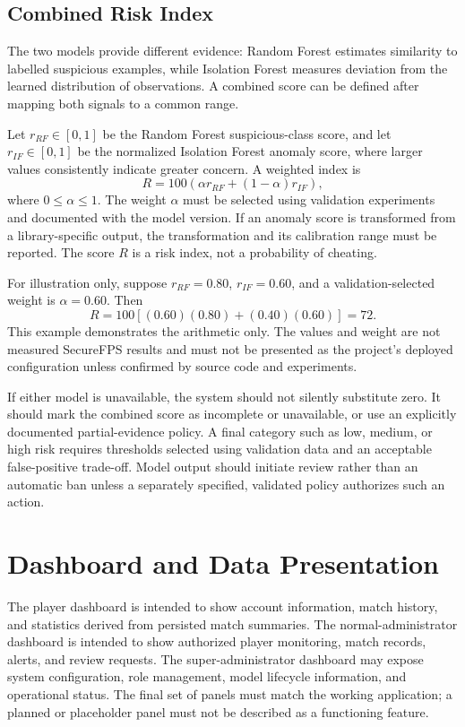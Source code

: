 \documentclass[conference]{IEEEtran}
\begin{document}
\subsection{Combined Risk Index}
The two models provide different evidence: Random Forest estimates similarity to labelled suspicious examples, while Isolation Forest measures deviation from the learned distribution of observations. A combined score can be defined after mapping both signals to a common range.

Let $r_{RF}\in[0,1]$ be the Random Forest suspicious-class score, and let $r_{IF}\in[0,1]$ be the normalized Isolation Forest anomaly score, where larger values consistently indicate greater concern. A weighted index is
\begin{equation}
R=100\left(\alpha r_{RF}+(1-\alpha)r_{IF}\right),
\label{eq:risk}
\end{equation}
where $0\leq\alpha\leq1$. The weight $\alpha$ must be selected using validation experiments and documented with the model version. If an anomaly score is transformed from a library-specific output, the transformation and its calibration range must be reported. The score $R$ is a risk index, not a probability of cheating.

For illustration only, suppose $r_{RF}=0.80$, $r_{IF}=0.60$, and a validation-selected weight is $\alpha=0.60$. Then
\begin{equation}
R=100[(0.60)(0.80)+(0.40)(0.60)]=72.
\end{equation}
This example demonstrates the arithmetic only. The values and weight are not measured SecureFPS results and must not be presented as the project's deployed configuration unless confirmed by source code and experiments.

If either model is unavailable, the system should not silently substitute zero. It should mark the combined score as incomplete or unavailable, or use an explicitly documented partial-evidence policy. A final category such as low, medium, or high risk requires thresholds selected using validation data and an acceptable false-positive trade-off. Model output should initiate review rather than an automatic ban unless a separately specified, validated policy authorizes such an action.

\section{Dashboard and Data Presentation}
The player dashboard is intended to show account information, match history, and statistics derived from persisted match summaries. The normal-administrator dashboard is intended to show authorized player monitoring, match records, alerts, and review requests. The super-administrator dashboard may expose system configuration, role management, model lifecycle information, and operational status. The final set of panels must match the working application; a planned or placeholder panel must not be described as a functioning feature.
\end{document}
